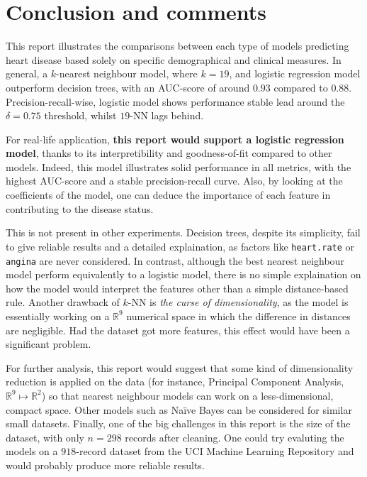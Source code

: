 
\section{Conclusion and comments}

This report illustrates the comparisons between each type of models predicting heart disease based solely on specific demographical and clinical measures. In general, a \( k \)-nearest neighbour model, where \( k = 19 \), and logistic regression model outperform decision trees, with an AUC-score of around \( 0.93 \) compared to \( 0.88 \). Precision-recall-wise, logistic model shows performance stable lead around the \( \delta = 0.75 \) threshold, whilst \( 19 \)-NN lags behind.

For real-life application, \textbf{this report would support a logistic regression model}, thanks to its interpretibility and goodness-of-fit compared to other models. Indeed, this model illustrates solid performance in all metrics, with the highest AUC-score and a stable precision-recall curve. Also, by looking at the coefficients of the model, one can deduce the importance of each feature in contributing to the disease status.

This is not present in other experiments. Decision trees, despite its simplicity, fail to give reliable results and a detailed explaination, as factors like \texttt{heart.rate} or \texttt{angina} are never considered. In contrast, although the best nearest neighbour model perform equivalently to a logistic model, there is no simple explaination on how the model would interpret the features other than a simple distance-based rule. Another drawback of \(k\)-NN is \textit{the curse of dimensionality}, as the model is essentially working on a \( \mathbb R^9 \) numerical space in which the difference in distances are negligible. Had the dataset got more features, this effect would have been a significant problem.

For further analysis, this report would suggest that some kind of dimensionality reduction is applied on the data (for instance, Principal Component Analysis, \( \mathbb R^9 \mapsto \mathbb R^2 \)) so that nearest neighbour models can work on a less-dimensional, compact space. Other models such as Na\"ive Bayes can be considered for similar small datasets. Finally, one of the big challenges in this report is the size of the dataset, with only \( n = 298 \) records after cleaning. One could try evaluting the models on a \( 918 \)-record dataset from the UCI Machine Learning Repository \citep{extradataset} and would probably produce more reliable results.